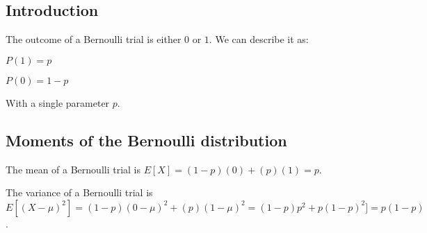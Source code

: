 
\subsection{Introduction}

The outcome of a Bernoulli trial is either \(0\) or \(1\). We can describe it as:

\(P(1)=p\)

\(P(0)=1-p\)

With a single parameter \(p\).

\subsection{Moments of the Bernoulli distribution}

The mean of a Bernoulli trial is \(E[X]=(1-p)(0)+(p)(1)=p\).

The variance of a Bernoulli trial is \(E[(X-\mu)^2]=(1-p)(0-\mu)^2+(p)(1-\mu)^2=(1-p)p^2+p(1-p)^2]=p(1-p)\).

